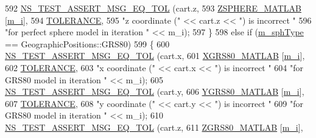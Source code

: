 \begin{DoxyCode}
592       \hyperlink{group__testing_ga9e7861b56b4e70db3b56044cb7a28e41}{NS\_TEST\_ASSERT\_MSG\_EQ\_TOL} (cart.z, 
593                                  \hyperlink{geo-to-cartesian-test_8cc_a4346834cba6d329a54d146eaea16624c}{ZSPHERE\_MATLAB} [\hyperlink{classGeoToCartesianTestCase_aeeb6a9cb21dad88d5ea4d939bf444f95}{m\_i}], 
594                                  \hyperlink{geo-to-cartesian-test_8cc_a89311a98397f9d6967d2cb10d5152d77}{TOLERANCE}, 
595                                  \textcolor{stringliteral}{"z coordinate ("} << cart.z << \textcolor{stringliteral}{") is incorrect "}
596                                  \textcolor{stringliteral}{"for perfect sphere model in iteration "} << m\_i);
597     \}
598   \textcolor{keywordflow}{else} \textcolor{keywordflow}{if} (\hyperlink{classGeoToCartesianTestCase_abf771e651f997641307173e08610a7d4}{m\_sphType} == GeographicPositions::GRS80)
599     \{
600       \hyperlink{group__testing_ga9e7861b56b4e70db3b56044cb7a28e41}{NS\_TEST\_ASSERT\_MSG\_EQ\_TOL} (cart.x, 
601                                  \hyperlink{geo-to-cartesian-test_8cc_af4c611b6a4fe5e678457f7d0cc865814}{XGRS80\_MATLAB} [\hyperlink{classGeoToCartesianTestCase_aeeb6a9cb21dad88d5ea4d939bf444f95}{m\_i}], 
602                                  \hyperlink{geo-to-cartesian-test_8cc_a89311a98397f9d6967d2cb10d5152d77}{TOLERANCE}, 
603                                  \textcolor{stringliteral}{"x coordinate ("} << cart.x << \textcolor{stringliteral}{") is incorrect "}
604                                  \textcolor{stringliteral}{"for GRS80 model in iteration "} << m\_i);
605       \hyperlink{group__testing_ga9e7861b56b4e70db3b56044cb7a28e41}{NS\_TEST\_ASSERT\_MSG\_EQ\_TOL} (cart.y, 
606                                  \hyperlink{geo-to-cartesian-test_8cc_a91670b344c6133c351d1e527135e211a}{YGRS80\_MATLAB} [\hyperlink{classGeoToCartesianTestCase_aeeb6a9cb21dad88d5ea4d939bf444f95}{m\_i}], 
607                                  \hyperlink{geo-to-cartesian-test_8cc_a89311a98397f9d6967d2cb10d5152d77}{TOLERANCE}, 
608                                  \textcolor{stringliteral}{"y coordinate ("} << cart.y << \textcolor{stringliteral}{") is incorrect "}
609                                  \textcolor{stringliteral}{"for GRS80 model in iteration "} << m\_i);
610       \hyperlink{group__testing_ga9e7861b56b4e70db3b56044cb7a28e41}{NS\_TEST\_ASSERT\_MSG\_EQ\_TOL} (cart.z, 
611                                  \hyperlink{geo-to-cartesian-test_8cc_ad1faf7a77160fbf52b205680087c4be7}{ZGRS80\_MATLAB} [\hyperlink{classGeoToCartesianTestCase_aeeb6a9cb21dad88d5ea4d939bf444f95}{m\_i}], 

\end{DoxyCode}
